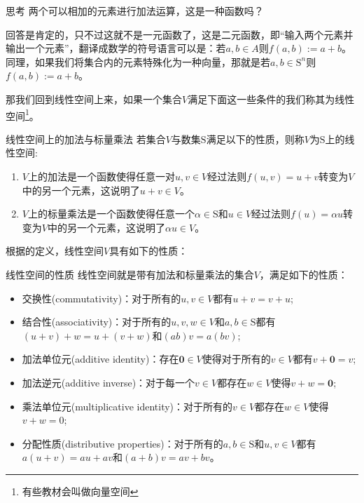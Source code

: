 \begin{ascolorbox1}{思考}
	两个可以相加的元素进行加法运算，这是一种函数吗？
\end{ascolorbox1}

回答是肯定的，只不过这就不是一元函数了，这是二元函数，即``输入两个元素并输出一个元素''，翻译成数学的符号语言可以是：若$a,b\in A$则$f(a,b):=a+b$。同理，如果我们将集合内的元素特殊化为一种向量，那就是若$a,b\in \mathrm{S}^n$则$f(a,b):=a+b$。

那我们回到线性空间上来，如果一个集合$V$满足下面这一些条件的我们称其为线性空间\footnote{有些教材会叫做向量空间}。

\begin{definition}{线性空间上的加法与标量乘法}
	若集合$V$与数集$\mathrm{S}$满足以下的性质，则称$V$为$\mathrm{S}$上的线性空间:
	\begin{enumerate}
		\item $V$上的加法是一个函数使得任意一对$u,v \in V$经过法则$f(u,v)=u+v$转变为$V$中的另一个元素，这说明了$u+v\in V$。
		\item $V$上的标量乘法是一个函数使得任意一个$\alpha \in \mathrm{S}$和$u\in V$经过法则$f(u)=\alpha u$转变为$V$中的另一个元素，这说明了$\alpha u \in V$。
	\end{enumerate}
\end{definition}

根据的定义，线性空间$V$具有如下的性质：

\begin{definition}{线性空间的性质}
	\label{linear.space.sit}
	线性空间就是带有加法和标量乘法的集合$V$，满足如下的性质：
	\begin{itemize}
		\item 交换性(commutativity)：对于所有的$u,v\in V$都有$u+v=v+u$;
		\item 结合性(associativity)：对于所有的$u,v,w \in V$和$a,b\in \mathrm{S}$都有$(u+v)+w=u+(v+w)$和$(ab)v=a(bv)$;
		\item 加法单位元(additive identity)：存在$\boldsymbol{0}\in V$使得对于所有的$v\in V$都有$v+\boldsymbol{0}=v$;
		\item 加法逆元(additive inverse)：对于每一个$v\in V$都存在$w\in V$使得$v+w=\boldsymbol{0}$;
		\item 乘法单位元(multiplicative identity)：对于所有的$v\in V$都存在$w\in V$使得$v+w=0$;
		\item 分配性质(distributive properties)：对于所有的$a,b \in \mathrm{S}$和$u,v \in V$都有$a(u+v)=au+av$和$(a+b)v=av+bv$。
	\end{itemize}
\end{definition}

